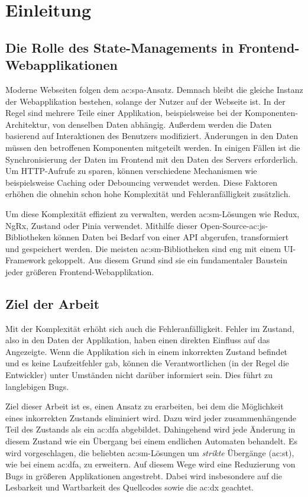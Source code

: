 \chapter{Einleitung}

\section{Die Rolle des State-Managements in Frontend-Webapplikationen}

Moderne Webseiten folgen dem \acrlong{ac:spa}-Ansatz. Demnach bleibt die gleiche Instanz der Webapplikation bestehen, solange der Nutzer auf der Webseite ist. In der Regel sind mehrere Teile einer Applikation, beispielsweise bei der Komponenten-Architektur, von denselben Daten abhängig. Außerdem werden die Daten basierend auf Interaktionen des Benutzers modifiziert. Änderungen in den Daten müssen den betroffenen Komponenten mitgeteilt werden. In einigen Fällen ist die Synchronisierung der Daten im Frontend mit den Daten des Servers erforderlich. Um HTTP-Aufrufe zu sparen, können verschiedene Mechanismen wie beispielsweise Caching oder Debouncing verwendet werden. Diese Faktoren erhöhen die ohnehin schon hohe Komplexität und Fehleranfälligkeit zusätzlich.

Um diese Komplexität effizient zu verwalten, werden \acrlong{ac:sm}-Lösungen wie Redux, NgRx, Zustand oder Pinia verwendet. Mithilfe dieser Open-Source-\acrlong{ac:js}-Bibliotheken können Daten bei Bedarf von einer API abgerufen, transformiert und gespeichert werden. Die meisten \acrlong{ac:sm}-Bibliotheken sind eng mit einem UI-Framework gekoppelt. Aus diesem Grund sind sie ein fundamentaler Baustein jeder größeren Frontend-Webapplikation.

\section{Ziel der Arbeit}

Mit der Komplexität erhöht sich auch die Fehleranfälligkeit. Fehler im Zustand, also in den Daten der Applikation, haben einen direkten Einfluss auf das Angezeigte. Wenn die Applikation sich in einem inkorrekten Zustand befindet und es keine Laufzeitfehler gab, können die Verantwortlichen (in der Regel die Entwickler) unter Umständen nicht darüber informiert sein. Dies führt zu langlebigen Bugs.

Ziel dieser Arbeit ist es, einen Ansatz zu erarbeiten, bei dem die Möglichkeit eines inkorrekten Zustands eliminiert wird. Dazu wird jeder zusammenhängende Teil des Zustands als ein \acrlong{ac:dfa} abgebildet. Dahingehend wird jede Änderung in diesem Zustand wie ein Übergang bei einem endlichen Automaten behandelt. Es wird vorgeschlagen, die beliebten \acrlong{ac:sm}-Lösungen um \textit{strikte} Übergänge (\acrshort{ac:st}), wie bei einem \acrlong{ac:dfa}, zu erweitern. Auf diesem Wege wird eine Reduzierung von Bugs in größeren Applikationen angestrebt. Dabei wird insbesondere auf die Lesbarkeit und Wartbarkeit des Quellcodes sowie die \acrlong{ac:dx} geachtet.

